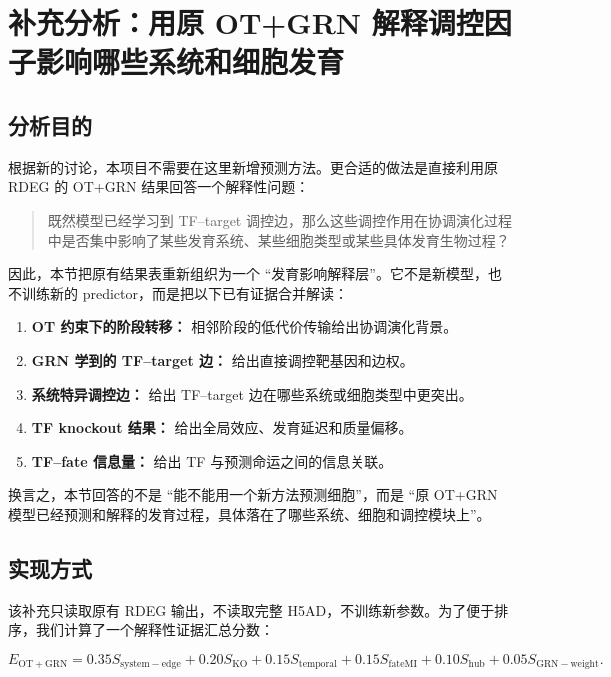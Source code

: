 \documentclass[UTF8,12pt]{ctexart}
\newcommand{\RDEG}{\textsc{RDEG}}
\newcommand{\OT}{\textsc{OT}}
\newcommand{\GRN}{\textsc{GRN}}
\begin{document}
\section{补充分析：用原 OT+GRN 解释调控因子影响哪些系统和细胞发育}

\subsection{分析目的}

根据新的讨论，本项目不需要在这里新增预测方法。更合适的做法是直接利用原 \RDEG{} 的 \OT{}+\GRN{} 结果回答一个解释性问题：

\begin{quote}
既然模型已经学习到 TF--target 调控边，那么这些调控作用在协调演化过程中是否集中影响了某些发育系统、某些细胞类型或某些具体发育生物过程？
\end{quote}

因此，本节把原有结果表重新组织为一个 ``发育影响解释层''。它不是新模型，也不训练新的 predictor，而是把以下已有证据合并解读：

\begin{enumerate}[label=\arabic*.]
    \item \textbf{OT 约束下的阶段转移：} 相邻阶段的低代价传输给出协调演化背景。
    \item \textbf{GRN 学到的 TF--target 边：} 给出直接调控靶基因和边权。
    \item \textbf{系统特异调控边：} 给出 TF--target 边在哪些系统或细胞类型中更突出。
    \item \textbf{TF knockout 结果：} 给出全局效应、发育延迟和质量偏移。
    \item \textbf{TF--fate 信息量：} 给出 TF 与预测命运之间的信息关联。
\end{enumerate}

换言之，本节回答的不是 ``能不能用一个新方法预测细胞''，而是 ``原 OT+\GRN{} 模型已经预测和解释的发育过程，具体落在了哪些系统、细胞和调控模块上''。

\subsection{实现方式}

该补充只读取原有 \RDEG{} 输出，不读取完整 H5AD，不训练新参数。为了便于排序，我们计算了一个解释性证据汇总分数：

\begin{equation}
E_{\mathrm{OT+GRN}} =
0.35 S_{\mathrm{system-edge}}
+0.20 S_{\mathrm{KO}}
+0.15 S_{\mathrm{temporal}}
+0.15 S_{\mathrm{fateMI}}
+0.10 S_{\mathrm{hub}}
+0.05 S_{\mathrm{GRN-weight}}.
\end{equation}
\end{document}
